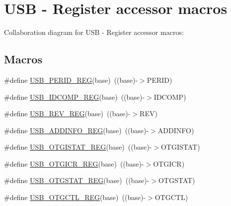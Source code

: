\hypertarget{group___u_s_b___register___accessor___macros}{}\section{U\+SB -\/ Register accessor macros}
\label{group___u_s_b___register___accessor___macros}
Collaboration diagram for U\+SB -\/ Register accessor macros\+:
\subsection*{Macros}
\begin{DoxyCompactItemize}
\item 
\#define \hyperlink{group___u_s_b___register___accessor___macros_ga61c99097ee83a271dafdfb6b04980cc8}{U\+S\+B\+\_\+\+P\+E\+R\+I\+D\+\_\+\+R\+EG}(base)~((base)-\/$>$P\+E\+R\+ID)
\item 
\#define \hyperlink{group___u_s_b___register___accessor___macros_ga74152969f2622631ccd8ceccf72c4e7e}{U\+S\+B\+\_\+\+I\+D\+C\+O\+M\+P\+\_\+\+R\+EG}(base)~((base)-\/$>$I\+D\+C\+O\+MP)
\item 
\#define \hyperlink{group___u_s_b___register___accessor___macros_gafdbb3ea723c0bb8a1f5bb42e84fbdfe5}{U\+S\+B\+\_\+\+R\+E\+V\+\_\+\+R\+EG}(base)~((base)-\/$>$R\+EV)
\item 
\#define \hyperlink{group___u_s_b___register___accessor___macros_ga618d42fa57e39a224a30a72f347573fb}{U\+S\+B\+\_\+\+A\+D\+D\+I\+N\+F\+O\+\_\+\+R\+EG}(base)~((base)-\/$>$A\+D\+D\+I\+N\+FO)
\item 
\#define \hyperlink{group___u_s_b___register___accessor___macros_ga1b290906273a7a293d262a00c3425319}{U\+S\+B\+\_\+\+O\+T\+G\+I\+S\+T\+A\+T\+\_\+\+R\+EG}(base)~((base)-\/$>$O\+T\+G\+I\+S\+T\+AT)
\item 
\#define \hyperlink{group___u_s_b___register___accessor___macros_ga96be0cb820aa0542e4c046f814b61636}{U\+S\+B\+\_\+\+O\+T\+G\+I\+C\+R\+\_\+\+R\+EG}(base)~((base)-\/$>$O\+T\+G\+I\+CR)
\item 
\#define \hyperlink{group___u_s_b___register___accessor___macros_gad50d4233733a0ec8cd3f8bd835aeb9fa}{U\+S\+B\+\_\+\+O\+T\+G\+S\+T\+A\+T\+\_\+\+R\+EG}(base)~((base)-\/$>$O\+T\+G\+S\+T\+AT)
\item 
\#define \hyperlink{group___u_s_b___register___accessor___macros_ga173b94208c5770ddcb9f9fb76c77d6a6}{U\+S\+B\+\_\+\+O\+T\+G\+C\+T\+L\+\_\+\+R\+EG}(base)~((base)-\/$>$O\+T\+G\+C\+TL)
\item 

\end{DoxyCompactItemize}
